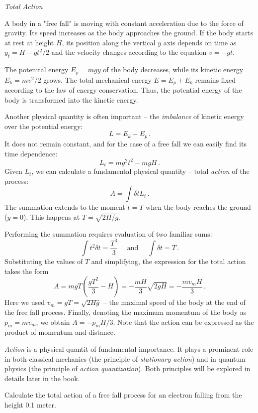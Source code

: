 \begin{flushleft}
	{\it Total Action}
\end{flushleft}
A body in a "free fall" is moving with constant acceleration due to the force of gravity. Its speed increases as the body approaches the ground. If the body starts at rest at height $H$, its position along the vertical $y$ axis depends on time as $y_t=H-gt^2/2$ and the velocity changes according to the equation $v=-gt$.

The potenital energy $E_p=mgy$ of the body decreases, while its kinetic energy $E_k=mv^2/2$ grows. The total mechanical energy $E=E_p+E_k$ remains fixed according to the law of energy conservation. Thus, the potential energy of the body is transformed into the kinetic energy.

Another physical quantity is often important -- the \emph{imbalance} of kinetic energy over the potential energy:
\[
L = E_k - E_p\,.
\]
It does not remain constant, and for the case of a free fall we can easily find its time dependence:
\[
L_t = mg^2t^2 - mgH\,.
\]
Given $L_t$, we can calculate a fundamental physical quantity -- total \emph{action} of the process:
\[
A = \int\delta t L_t\,.
\]
The summation extends to the moment $t=T$ when the body reaches the ground ($y=0$). This happens at $T=\sqrt{2H/g}$.

Performing the summation requires evaluation of two familiar sums:
\[
\int t^2\delta t =\frac{T^3}{3}\quad\textrm{ and }\quad \int \delta t=T\,.
\]
Substituting the values of $T$ and simplifying, the expression for the total action takes the form
\[
A = mgT(\frac{gT^2}{3}-H)=-\frac{mH}{3}\sqrt{2gH}=-\frac{mv_{m}H}{3}\,.
\]
Here we used $v_m=gT=\sqrt{2Hg}$ -- the maximal speed of the body at the end of the free fall process. Finally, denoting the maximum momentum of the body as $p_m=mv_m$, we obtain $A=-p_m H/3$. Note that the action can be expressed as the product of momentum and distance.

\emph{Action} is a physical quantit of fundamental importance. It plays a prominent role in both classical mechanics (the principle of \emph{stationary action}) and in quantum physics (the principle of \emph{action quantization}). Both principles will be explored in details later in the book.

\begin{exercise}
	Calculate the total action of a free fall process for an electron falling from the height 0.1 meter.
\end{exercise}


